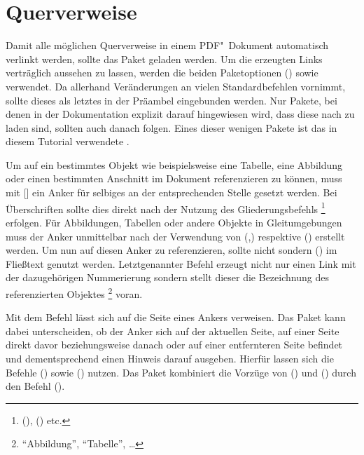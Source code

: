 \documentclass[%
  english,ngerman,%
  cdgeometry=no,DIV=12,%
  automark,%
  listof=toc,%
]{tudscrartcl}
\begin{document}
\section{Querverweise}
\label{sec:references}%
%
Damit alle möglichen Querverweise in einem PDF"~Dokument automatisch verlinkt 
werden, sollte das Paket  geladen werden. Um die erzeugten 
Links verträglich aussehen zu lassen, werden die beiden Paketoptionen 
() sowie  
verwendet. Da  allerhand Veränderungen an vielen 
Standardbefehlen vornimmt, sollte dieses als letztes in der Präambel 
eingebunden werden. Nur Pakete, bei denen in der Dokumentation explizit darauf 
hingewiesen wird, dass diese nach  zu laden sind, sollten 
auch danach folgen. Eines dieser wenigen Pakete ist das in diesem Tutorial 
verwendete . 
%
\begin{Hint}
\usepackage[colorlinks,linkcolor=blue]{hyperref}

\end{Hint}
%
Um auf ein bestimmtes Objekt wie beispielsweise eine Tabelle, eine Abbildung 
oder einen bestimmten Anschnitt im Dokument referenzieren zu können, muss mit 
[] ein Anker für selbiges an der entsprechenden 
Stelle gesetzt werden. Bei Überschriften sollte dies direkt nach der Nutzung 
des Gliederungsbefehls%
\footnote{%
  (), 
  () etc.%
}
erfolgen. Für Abbildungen, Tabellen oder andere Objekte in Gleitumgebungen 
muss der Anker unmittelbar nach der Verwendung von 
(,) respektive 
() erstellt werden. Um nun auf diesen 
Anker zu referenzieren, sollte nicht  sondern 
() im Fließtext genutzt werden. 
Letztgenannter Befehl erzeugt nicht nur einen Link mit der dazugehörigen 
Nummerierung sondern stellt dieser die Bezeichnung des referenzierten Objektes%
\footnote{\enquote{Abbildung}, \enquote{Tabelle}, \dots} voran. 

Mit dem Befehl  lässt sich auf die Seite eines Ankers verweisen.
Das Paket  kann dabei unterscheiden, ob der Anker sich auf 
der aktuellen Seite, auf einer Seite direkt davor beziehungsweise danach oder 
auf einer entfernteren Seite befindet und dementsprechend einen Hinweis darauf 
ausgeben. Hierfür lassen sich die Befehle () 
sowie () nutzen. Das Paket  
kombiniert die Vorzüge von () und 
() durch den Befehl 
().
\end{document}
